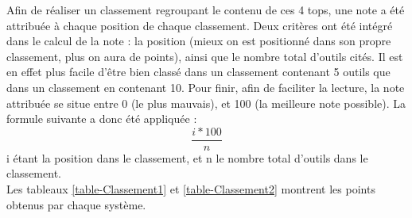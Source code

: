 \documentclass[paper=a4, fontsize=11pt]{scrartcl}
\begin{document}
Afin de réaliser un classement regroupant le contenu de ces 4 tops, une note a été attribuée à chaque position de chaque classement. Deux critères ont été intégré dans le calcul de la note : la position (mieux on est positionné dans son propre classement, plus on aura de points), ainsi que le nombre total d'outils cités. Il est en effet plus facile d'être bien classé dans un classement contenant 5 outils que dans un classement en contenant 10. Pour finir, afin de faciliter la lecture, la note attribuée se situe entre 0 (le plus mauvais), et 100 (la meilleure note possible). La formule suivante a donc été appliquée :
\[\frac{i * 100}{n}\]
i étant la position dans le classement, et n le nombre total d'outils dans le classement.\\

Les tableaux \ref{table-Classement1} et \ref{table-Classement2} montrent les points obtenus par chaque système.
\end{document}
